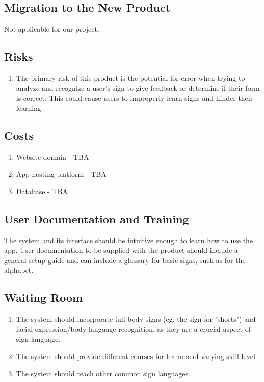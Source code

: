 \documentclass[12pt, titlepage]{article}
\begin{document}
\subsection{Migration to the New Product}
Not applicable for our project.

\subsection{Risks}

\begin{enumerate}
    \item The primary risk of this product is the potential for error when trying to analyze and recognize a user's sign to give feedback or determine if their form is correct. This could cause users to improperly learn signs and hinder their learning.
\end{enumerate}

\subsection{Costs}
\begin{enumerate}
    \item Website domain - TBA
    \item App hosting platform - TBA
    \item Database - TBA
\end{enumerate}

\subsection{User Documentation and Training}
The system and its interface should be intuitive enough to learn how to use the app. User documentation to be supplied with the product should include a general setup guide and can include a glossary for basic signs, such as for the alphabet.

\subsection{Waiting Room}
\begin{enumerate}
    \item The system should incorporate full body signs (eg. the sign for "shorts") and facial expression/body language recognition, as they are a crucial aspect of sign language.
    \item The system should provide different courses for learners of varying skill level.
    \item The system should teach other common sign languages.
\end{enumerate}
\end{document}

